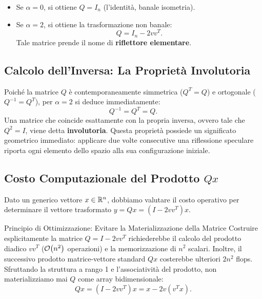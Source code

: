 \begin{itemize}
    \item Se $\alpha = 0$, si ottiene $Q = I_n$ (l'identit\`a, banale isometria).
    \item Se $\alpha = 2$, si ottiene la trasformazione non banale:
    \begin{equation}
        Q = I_n - 2 v v^T.
    \end{equation}
    Tale matrice prende il nome di \textbf{riflettore elementare}.
\end{itemize}

\subsection{Calcolo dell'Inversa: La Propriet\`a Involutoria}
Poich\'e la matrice $Q$ \`e contemporaneamente simmetrica ($Q^T = Q$) e ortogonale ($Q^{-1} = Q^T$), per $\alpha = 2$ si deduce immediatamente:
\begin{equation}
    Q^{-1} = Q^T = Q.
\end{equation}
Una matrice che coincide esattamente con la propria inversa, ovvero tale che $Q^2 = I$, viene detta \textbf{involutoria}. Questa propriet\`a possiede un significato geometrico immediato: applicare due volte consecutive una riflessione speculare riporta ogni elemento dello spazio alla sua configurazione iniziale.

\subsection{Costo Computazionale del Prodotto $Q x$}
Dato un generico vettore $x \in \mathbb{R}^n$, dobbiamo valutare il costo operativo per determinare il vettore trasformato $y = Q x = (I - 2 v v^T) x$.

\begin{alertblock}{Principio di Ottimizzazione: Evitare la Materializzazione della Matrice}
Costruire esplicitamente la matrice $Q = I - 2 v v^T$ richiederebbe il calcolo del prodotto diadico $v v^T$ ($\mathcal{O}\!\left(n^2\right)$ operazioni) e la memorizzazione di $n^2$ scalari. Inoltre, il successivo prodotto matrice-vettore standard $Q x$ costerebbe ulteriori $2n^2$ flops.
Sfruttando la struttura a rango 1 e l'associativit\`a del prodotto, non materializziamo mai $Q$ come array bidimensionale:
\begin{equation}
    Q x = (I - 2 v v^T) x = x - 2 v (v^T x).
    \label{eq:valutazione-vettore-householder}
\end{equation}
\end{alertblock}


